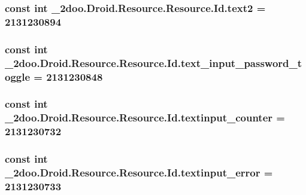 \hypertarget{class__2doo_1_1_droid_1_1_resource_1_1_id_b768de86486881283f57695095b5747a}{
\subsubsection[{text2}]{\setlength{\rightskip}{0pt plus 5cm}const int \_\-2doo.Droid.Resource.Resource.Id.text2 = 2131230894}}
\label{class__2doo_1_1_droid_1_1_resource_1_1_id_b768de86486881283f57695095b5747a}


\hypertarget{class__2doo_1_1_droid_1_1_resource_1_1_id_990b73815c0c8a70e2dd5041dc791627}{
\subsubsection[{text\_\-input\_\-password\_\-toggle}]{\setlength{\rightskip}{0pt plus 5cm}const int \_\-2doo.Droid.Resource.Resource.Id.text\_\-input\_\-password\_\-toggle = 2131230848}}
\label{class__2doo_1_1_droid_1_1_resource_1_1_id_990b73815c0c8a70e2dd5041dc791627}


\hypertarget{class__2doo_1_1_droid_1_1_resource_1_1_id_346ae0e243191714bc04ed7d88a1d56b}{
\subsubsection[{textinput\_\-counter}]{\setlength{\rightskip}{0pt plus 5cm}const int \_\-2doo.Droid.Resource.Resource.Id.textinput\_\-counter = 2131230732}}
\label{class__2doo_1_1_droid_1_1_resource_1_1_id_346ae0e243191714bc04ed7d88a1d56b}


\hypertarget{class__2doo_1_1_droid_1_1_resource_1_1_id_57df9c69237456246a563c1d8da68676}{
\subsubsection[{textinput\_\-error}]{\setlength{\rightskip}{0pt plus 5cm}const int \_\-2doo.Droid.Resource.Resource.Id.textinput\_\-error = 2131230733}}
\label{class__2doo_1_1_droid_1_1_resource_1_1_id_57df9c69237456246a563c1d8da68676}


